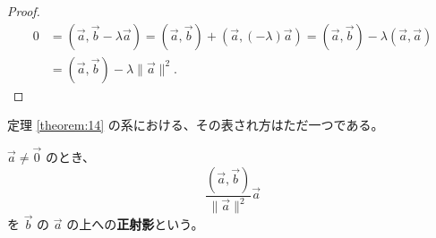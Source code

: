 \begin{proof}
  \begin{align*}
    0 &= (\vec{a},\vec{b}-\lambda\vec{a})=(\vec{a},\vec{b})+(\vec{a},(-\lambda)\vec{a})=(\vec{a},\vec{b})-\lambda(\vec{a},\vec{a}) \\
      &= (\vec{a},\vec{b})-\lambda\|\vec{a}\|^2.
  \end{align*}
\end{proof}

\begin{col*}
  定理 \ref{theorem:14} の系における、その表され方はただ一つである。
\end{col*}

\begin{dfn}\label{definition:21}
  \(\vec{a}\neq\vec{0}\) のとき、
  \[\frac{(\vec{a},\vec{b})}{\|\vec{a}\|^2}\vec{a}\]
  を \(\vec{b}\) の \(\vec{a}\) の上への\textbf{正射影}という。
\end{dfn}
